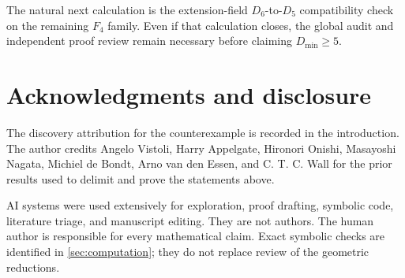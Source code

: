 \documentclass[11pt,reqno]{amsart}
\begin{document}
The natural next calculation is the extension-field \(D_6\)-to-\(D_5\)
compatibility check on the remaining \(F_4\) family.  Even if that
calculation closes, the global audit and independent proof review remain
necessary before claiming \(D_{\min}\ge5\).

\appendix






\section*{Acknowledgments and disclosure}

The discovery attribution for the counterexample is recorded in the
introduction. The author credits Angelo Vistoli, Harry Appelgate, Hironori
Onishi, Masayoshi Nagata, Michiel de Bondt, Arno van den Essen, and
C. T. C. Wall for the prior results used to delimit and prove the statements
above.

AI systems were used extensively for exploration, proof drafting, symbolic
code, literature triage, and manuscript editing.  They are not authors.  The
human author is responsible for every mathematical claim.  Exact symbolic
checks are identified in \cref{sec:computation}; they do not replace review
of the geometric reductions.



\end{document}
